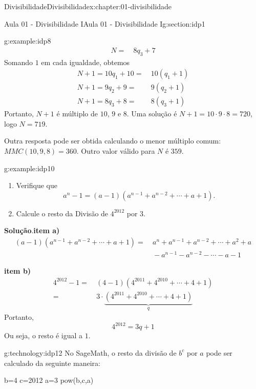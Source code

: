 \documentclass[oneside,10pt,]{book}
\newcommand{\blocktitlefont}{\relax}
\newcommand{\terminology}[1]{\textbf{#1}}
\numberwithin{equation}{section}
\newcommand{\amp}{&}
\begin{document}
\begin{chapterptx}{Divisibilidade}{}{Divisibilidade}{}{}{x:chapter:01-divisibilidade}
\begin{sectionptx}{Aula 01 - Divisibilidade I}{}{Aula 01 - Divisibilidade I}{}{}{g:section:idp1}
\begin{example}{}{g:example:idp8}
\begin{align*}
N = \amp~8q_3+7
\end{align*}
Somando \(1\) em cada igualdade, obtemos%
\begin{align*}
N+1 = 10q_1+10 = \amp~10(q_1+1)\\
N+1 = 9q_2+9 = \amp~9(q_2+1)\\
N+1 = 8q_3+8 = \amp~8(q_3+1)
\end{align*}
Portanto, \(N+1\) é múltiplo de \(10\), \(9\) e \(8\). Uma solução é \(N+1 = 10\cdot 9\cdot 8 = 720\), logo \(N=719\).%
\par
Outra resposta pode ser obtida calculando o menor múltiplo comum: \(MMC(10, 9, 8)=360\). Outro valor válido para \(N\) é \(359\).%
\end{example}
\begin{example}{}{g:example:idp10}%
%
\begin{enumerate}[label=\alph*]
\item{}Verifique que%
\begin{equation*}
a^n-1 = (a-1)(a^{n-1}+a^{n-2}+\cdots+a+1).
\end{equation*}
%
\item{}Calcule o resto da Divisão de \(4^{2012}\) por 3.%
\end{enumerate}
\textbf{\blocktitlefont Solução}.\hypertarget{g:solution:idp11}{}\quad{}\terminology{item a)}%
\begin{align*}
(a-1)(a^{n-1}+a^{n-2}+\cdots+a+1) =\amp~ a^n+a^{n-1}+a^{n-2}+\cdots+ a^2+a \\
\amp~ - a^{n-1} - a^{n-2}-\cdots-a-1
\end{align*}
%
\par
\terminology{item b)}%
\begin{align*}
4^{2012}-1 =\amp~ (4-1)(4^{2011}+4^{2010}+\cdots+4+1) \\
=\amp~ 3\cdot\underbrace{(4^{2011}+4^{2010}+\cdots+4+1)}_{q} 
\end{align*}
Portanto,%
\begin{equation*}
4^{2012} = 3q+1
\end{equation*}
Ou seja, o resto é igual a \(1\).%
\end{example}
\begin{technology}{}{g:technology:idp12}%
No SageMath, o resto da divisão de \(b^c\) por \(a\) pode ser calculado da seguinte maneira: \begin{sageinput}
b=4
c=2012
a=3
pow(b,c,a)
\end{sageinput}
\begin{sageoutput}


\end{sageoutput}
\end{technology}
\end{sectionptx}
\end{chapterptx}
\end{document}
